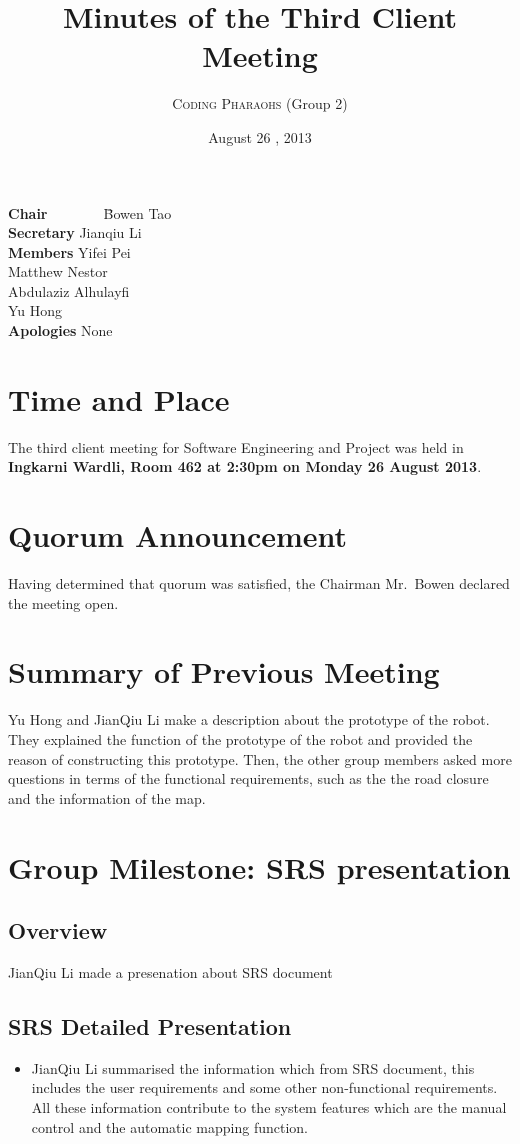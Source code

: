 \documentclass[12pt, a4paper]{article}
\title{Minutes of the Third Client Meeting}
\author{\textsc{Coding Pharaohs} (Group 2)}
\date{August 26 , 2013}
\begin{document}
\maketitle
\begin{tabbing}
\textbf{Chair}~~~~~~~~\= Bowen Tao   \\
\textbf{Secretary}    \>      Jianqiu Li       \\
\textbf{Members}      \>Yifei Pei             \\
                      \>Matthew Nestor        \\
                      \>  Abdulaziz Alhulayfi    \\
                      \>Yu Hong               \\
\textbf{Apologies}    \>None                  \\
\end{tabbing}
\section{Time and Place}
The third client meeting for Software Engineering and Project was held in \textbf{Ingkarni Wardli, Room 462 \textnormal{at} 2:30pm \textnormal{on} Monday 26 August 2013}.
\section{Quorum Announcement}
Having determined that quorum was satisfied, the Chairman Mr.~Bowen declared the meeting open.
\section{Summary of Previous Meeting}
Yu Hong and JianQiu Li make a description about the prototype of the robot. They explained the function of the prototype of the robot and provided the reason of constructing this prototype. Then, the other group members asked more questions in terms of the functional requirements, such as the the road closure and the information of the map. 
\section{Group Milestone: SRS presentation}
\subsection{Overview}
JianQiu Li made a presenation about SRS document


\subsection{SRS Detailed Presentation}
\begin{itemize}
 \item JianQiu Li summarised the information which from SRS document, this includes the user requirements and some other non-functional requirements. All these information contribute to the system features which are the manual control and the automatic mapping function. 
\end{itemize}
\end{document}
